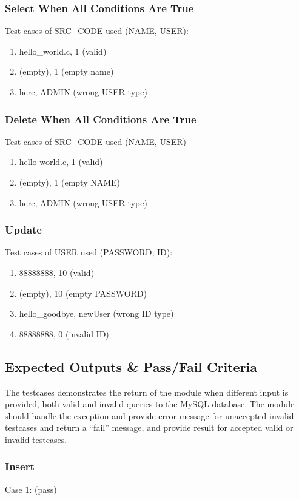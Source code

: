 \subsubsection{Select When All Conditions Are True}
Test cases of SRC\_CODE used (NAME, USER):
\begin{enumerate}
  \item hello\_world.c, 1 (valid)
  \item (empty), 1 (empty name)
  \item here, ADMIN (wrong USER type)
\end{enumerate}

\subsubsection{Delete When All Conditions Are True}
Test cases of SRC\_CODE used (NAME, USER)
\begin{enumerate}
  \item hello-world.c, 1 (valid)
  \item (empty), 1 (empty NAME)
  \item here, ADMIN (wrong USER type)
\end{enumerate}

\subsubsection{Update}
Test cases of USER used (PASSWORD, ID):
\begin{enumerate}
  \item 88888888, 10 (valid)
  \item (empty), 10 (empty PASSWORD)
  \item hello\_goodbye, newUser (wrong ID type)
  \item 88888888, 0 (invalid ID)
\end{enumerate}

\subsection{Expected Outputs \& Pass/Fail Criteria}
The testcases demonstrates the return of the module when different input is provided, both valid and invalid queries to the MySQL database. The module should handle the exception and provide error message for unaccepted invalid testcases and return a ``fail'' message, and provide result for accepted valid or invalid testcases.
\subsubsection{Insert}
Case 1: (pass)


